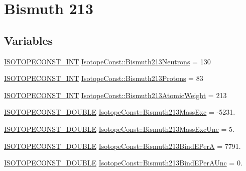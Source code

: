 \hypertarget{group___isotope_const-_bismuth-_bi213}{}\section{Bismuth 213}
\label{group___isotope_const-_bismuth-_bi213}
\subsection*{Variables}
\begin{DoxyCompactItemize}
\item 
\mbox{\hyperlink{group___isotope_const-_macros_ga5f18360b3e99483a35c32d789e62621c}{I\+S\+O\+T\+O\+P\+E\+C\+O\+N\+S\+T\+\_\+\+I\+NT}} \mbox{\hyperlink{group___isotope_const-_bismuth-_bi213_gacb541ffbac2f6c4bf667e3a50c8c904d}{Isotope\+Const\+::\+Bismuth213\+Neutrons}} = 130
\item 
\mbox{\hyperlink{group___isotope_const-_macros_ga5f18360b3e99483a35c32d789e62621c}{I\+S\+O\+T\+O\+P\+E\+C\+O\+N\+S\+T\+\_\+\+I\+NT}} \mbox{\hyperlink{group___isotope_const-_bismuth-_bi213_ga4d0418ed45a2141c972df5c260f0404b}{Isotope\+Const\+::\+Bismuth213\+Protons}} = 83
\item 
\mbox{\hyperlink{group___isotope_const-_macros_ga5f18360b3e99483a35c32d789e62621c}{I\+S\+O\+T\+O\+P\+E\+C\+O\+N\+S\+T\+\_\+\+I\+NT}} \mbox{\hyperlink{group___isotope_const-_bismuth-_bi213_ga073c01ade862db842439f9161faf1a0b}{Isotope\+Const\+::\+Bismuth213\+Atomic\+Weight}} = 213
\item 
\mbox{\hyperlink{group___isotope_const-_macros_ga8f45a7272ce02c0b4c65c44636ed719a}{I\+S\+O\+T\+O\+P\+E\+C\+O\+N\+S\+T\+\_\+\+D\+O\+U\+B\+LE}} \mbox{\hyperlink{group___isotope_const-_bismuth-_bi213_ga019a361547772bbf6a2becc583814485}{Isotope\+Const\+::\+Bismuth213\+Mass\+Exc}} = -\/5231.
\item 
\mbox{\hyperlink{group___isotope_const-_macros_ga8f45a7272ce02c0b4c65c44636ed719a}{I\+S\+O\+T\+O\+P\+E\+C\+O\+N\+S\+T\+\_\+\+D\+O\+U\+B\+LE}} \mbox{\hyperlink{group___isotope_const-_bismuth-_bi213_ga59e039270ab3b0288209f7bac76bcd7b}{Isotope\+Const\+::\+Bismuth213\+Mass\+Exc\+Unc}} = 5.
\item 
\mbox{\hyperlink{group___isotope_const-_macros_ga8f45a7272ce02c0b4c65c44636ed719a}{I\+S\+O\+T\+O\+P\+E\+C\+O\+N\+S\+T\+\_\+\+D\+O\+U\+B\+LE}} \mbox{\hyperlink{group___isotope_const-_bismuth-_bi213_ga39e31d14186e7e953d7ac5b784a7d8ea}{Isotope\+Const\+::\+Bismuth213\+Bind\+E\+PerA}} = 7791.
\item 
\mbox{\hyperlink{group___isotope_const-_macros_ga8f45a7272ce02c0b4c65c44636ed719a}{I\+S\+O\+T\+O\+P\+E\+C\+O\+N\+S\+T\+\_\+\+D\+O\+U\+B\+LE}} \mbox{\hyperlink{group___isotope_const-_bismuth-_bi213_gaaa599a871a76d7d563b6f870e37c7fde}{Isotope\+Const\+::\+Bismuth213\+Bind\+E\+Per\+A\+Unc}} = 0.

\end{DoxyCompactItemize}
